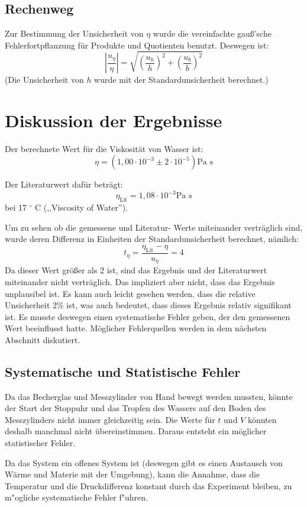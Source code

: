 \documentclass[11pt,a4paper]{article}
\begin{document}
\begin{tcolorbox}[colback=white]
\subsection{Rechenweg}
Zur Bestimmung der Unsicherheit von $\eta$ wurde die vereinfachte gauß'sche Fehlerfortpflanzung für Produkte und Quotienten benutzt. Deswegen ist:
$$\left\vert \frac{u_\eta}{\eta} \right \vert 
= \sqrt{(\frac{u_h}{h})^2+(\frac{u_b}{b})^2} $$
(Die Unsicherheit von $h$ wurde mit der Standardunsicherheit berechnet.)
	
\end{tcolorbox}


\section{Diskussion der Ergebnisse}
Der berechnete Wert für die Viskosität von Wasser ist:
$$\eta = (1,00 \cdot 10^{-3} \pm 2\cdot10^{-5}) \textrm{Pa s}$$

Der Literaturwert dafür beträgt:
$$\eta_\textrm{Lit} = 1,08 \cdot 10^{-3} \textrm{Pa s}$$
bei 17 $^\circ$ C (,,Viscosity of Water'').

Um zu sehen ob die gemessene und Literatur- Werte miteinander verträglich sind, wurde deren Differenz in Einheiten der Standardunsicherheit berechnet, nämlich:
$$ t_\eta = \frac{\eta_\textrm{Lit} - \eta}{u_\eta} = 4 $$
Da dieser Wert größer als 2 ist, sind das Ergebnis und der Literaturwert miteinander nicht verträglich. Das impliziert aber nicht, dass das Ergebnis unplausibel ist. Es kann auch leicht gesehen werden, dass die relative Unsicherheit 2\% ist, was auch bedeutet, dass dieses Ergebnis relativ signifikant ist. Es musste deswegen einen systematische Fehler geben, der den gemessenen Wert beeinflusst hatte. Möglicher Fehlerquellen werden in dem nächsten Abschnitt diskutiert. 


\subsection{Systematische und Statistische Fehler}
Da das Becherglas und Messzylinder von Hand bewegt werden mussten, könnte der Start der Stoppuhr und das Tropfen des Wassers auf den Boden des Messzylinders nicht immer gleichzeitig sein. Die Werte für $t$ und $V$ könnten deshalb manchmal nicht übereinstimmen. Daraus entsteht ein möglicher statistischer Fehler.

Da das System ein offenes System ist (deswegen gibt es einen Austausch von Wärme und Materie mit der Umgebung), kann die Annahme, dass die Temperatur und die Druckdifferenz konstant durch das Experiment bleiben, zu m"ogliche systematische Fehler f"uhren.
\end{document}
